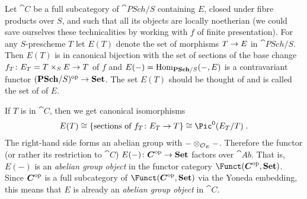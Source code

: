 \documentclass[a4paper,parskip=half,numbers=enddot, DIV=12]{scrreprt}
\begin{document}
	Let $\cat C$ be a full subcategory of $\cat{PSch}/S$ containing $E$, closed under fibre products over $S$, and such that all its objects are locally noetherian (we could save ourselves these technicalities by working with $f$ of finite presentation). For any $S$-prescheme $T$ let $E(T)$ denote the set of morphisms $T\morphism E$ in $\cat{PSch}/S$. Then $E(T)$ is in canonical bijection with the set of sections of the base change $f_T\colon E_T=T\times_SE\morphism T$ of $f$ and $E(-)=\Hom_{\cat{PSch}/S}(-,E)$ is a contravariant functor $(\cat{PSch}/S)^\op\morphism\cat{Set}$. The set $E(T)$ should be thought of and is called the set of  of $E$.
	
	If $T$ is in $\cat C$, then we get canonical isomorphisms
	\begin{align*}
		E(T)\cong\left\{\text{sections of }f_T\colon E_T\to T\right\}\cong\Pic^0(E_T/T)\;.
	\end{align*}
	The right-hand side forms an abelian group with $-\otimes_{\mathcal{O}_E}-$. Therefore the functor (or rather its restriction to $\cat C$) $E(-)\colon \cat C^\op\morphism\cat{Set}$ factors over $\cat{Ab}$. That is, $E(-)$ is an \emph{abelian group object} in the functor category $\Funct(\cat{C}^\op,\cat{Set})$. Since $\cat C^\op$ is a full subcategory of $\Funct(\cat{C}^\op,\cat{Set})$ via the Yoneda embedding, this means that $E$ is already an \emph{abelian group object} in $\cat C$.
	
\end{document}
